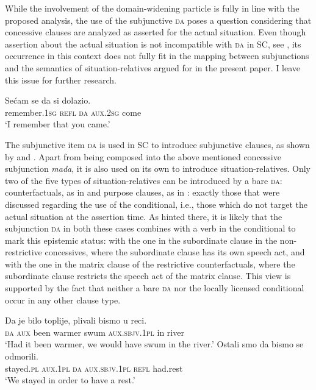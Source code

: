 \documentclass[output=paper]{langscibook}
\begin{document}
\noindent While the involvement of the domain-widening particle is fully in line with the proposed analysis, the use of the subjunctive \textsc{da} poses a question considering that concessive clauses are analyzed as asserted for the actual situation. Even though assertion about the actual situation is not incompatible with \textsc{da} in SC, see , its occurrence in this context does not fully fit in the mapping between subjunctions and the semantics of situation-relatives argued for in the present paper. I leave this issue for further research.

\ea\label{ex:Factive-da}
    \gll Sećam se da si dolazio.\\
    remember.\textsc{1sg} \textsc{refl} \textsc{da} \textsc{aux.2sg} come\\
    \glt `I remember that you came.'
\z

\noindent The subjunctive item \textsc{da} is used in SC to introduce subjunctive clauses, as shown by \citet{Topolinska1992} and \citet{Miseska-Tomic2004}. Apart from being composed into the above mentioned concessive subjunction \textit{mada}, it is also used on its own to introduce situation-relatives. Only two of the five types of situation-relatives can be introduced by a bare \textsc{da}: counterfactuals, as in  and purpose clauses, as in : exactly those that were discussed regarding the use of the conditional, i.e., those which do not target the actual situation at the assertion time. As hinted there, it is likely that the subjunction \textsc{da} in both these cases combines with a verb in the conditional to mark this epistemic status: with the one in the subordinate clause in the non-restrictive concessives, where the subordinate clause has its own speech act, and with the one in the matrix clause of the restrictive counterfactuals, where the subordinate clause restricts the speech act of the matrix clause. This view is supported by the fact that neither a bare \textsc{da} nor the locally licensed conditional occur in any other clause type.

\ea\label{ex:Da-clauses1}
    \ea \gll Da je bilo toplije, plivali bismo u reci.\\
    \textsc{da} \textsc{aux} been warmer swum \textsc{aux.sbjv.1pl} in river\\
    \glt `Had it been warmer, we would have swum in the river.'\label{ex:Da-clauses-a}
	\ex \gll Ostali smo da bismo se odmorili.\\
    stayed.\textsc{pl} \textsc{aux.1pl} \textsc{da} \textsc{aux.sbjv.1pl} \textsc{refl} had.rest\\
\glt `We stayed in order to have a rest.'\label{ex:Da-clauses-b}
\z\z
\end{document}
